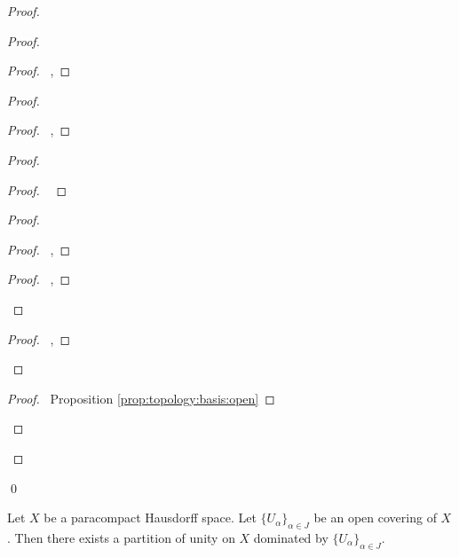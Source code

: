 \begin{proof}
\begin{proof}
    \begin{proof}
      \pf\ , 
    \end{proof}
    \begin{proof}
      \begin{proof}
        \pf\ , 
      \end{proof}
      \begin{proof}
        \begin{proof}
          \pf\ 
        \end{proof}
        \begin{proof}
          \begin{proof}
            \pf\ , 
          \end{proof}
          \qedstep
          \begin{proof}
            \pf\ , 
          \end{proof}
        \end{proof}
        \begin{proof}
          \pf\ , 
        \end{proof}
      \end{proof}
      \qedstep
      \begin{proof}
        \pf\ Proposition \ref{prop:topology:basis:open}
      \end{proof}
    \end{proof}
  \end{proof}
  \qed
\end{proof}

\begin{thm}[AC]
  \label{thm:metric:paracompact_Hausdorff:partition_of_unity}
  Let $X$ be a paracompact Hausdorff space. Let $\{ U_\alpha \}_{\alpha \in J}$ be an open covering of $X$. Then there exists a partition of unity on $X$ dominated by $\{ U_\alpha \}_{\alpha \in J}$.
\end{thm}

